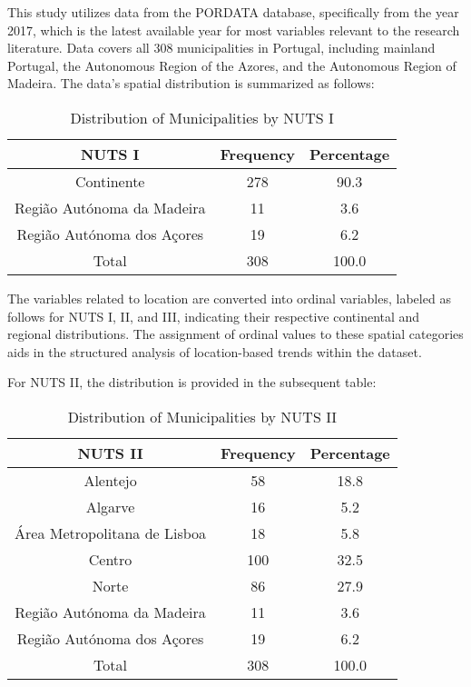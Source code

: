 \documentclass{aip-cp}
\begin{document}
This study utilizes data from the PORDATA database, specifically from the year 2017, which is the latest available year for most variables relevant to the research literature. Data covers all 308 municipalities in Portugal, including mainland Portugal, the Autonomous Region of the Azores, and the Autonomous Region of Madeira. The data's spatial distribution is summarized as follows:

\begin{table}[h!]
\centering
\begin{tabular}{ccc}
\toprule
NUTS I & Frequency & Percentage \\ 
\midrule
Continente & 278 & 90.3 \\
Região Autónoma da Madeira & 11 & 3.6 \\
Região Autónoma dos Açores & 19 & 6.2 \\
Total & 308 & 100.0 \\ 
\bottomrule
\end{tabular}
\caption{Distribution of Municipalities by NUTS I}
\label{tab:my_label}
\end{table}

The variables related to location are converted into ordinal variables, labeled as follows for NUTS I, II, and III, indicating their respective continental and regional distributions. The assignment of ordinal values to these spatial categories aids in the structured analysis of location-based trends within the dataset.

For NUTS II, the distribution is provided in the subsequent table:

\begin{table}[h!]
\centering
\begin{tabular}{ccc}
\toprule
NUTS II & Frequency & Percentage \\ 
\midrule
Alentejo & 58 & 18.8 \\
Algarve & 16 & 5.2 \\
Área Metropolitana de Lisboa & 18 & 5.8 \\
Centro & 100 & 32.5 \\
Norte & 86 & 27.9 \\
Região Autónoma da Madeira & 11 & 3.6 \\
Região Autónoma dos Açores & 19 & 6.2 \\
Total & 308 & 100.0 \\ 
\bottomrule
\end{tabular}
\caption{Distribution of Municipalities by NUTS II}
\label{tab:my_label_1}
\end{table}
\end{document}

